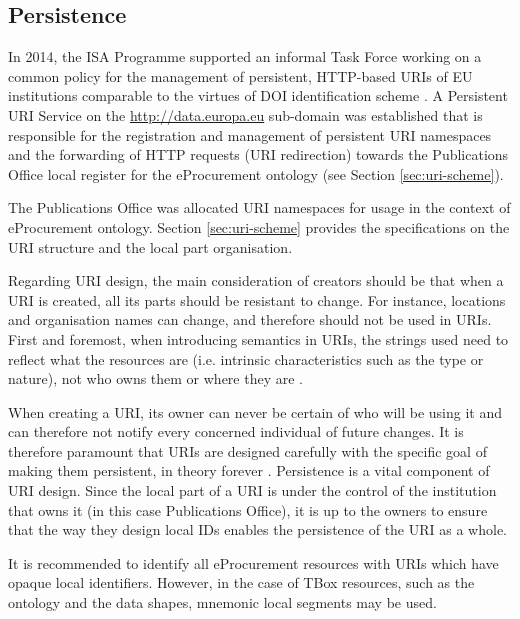 	\subsection{Persistence}
	\label{sec:persistence}
	
	In 2014, the ISA Programme supported an informal Task Force working on a common policy for the management of persistent, HTTP-based URIs of EU institutions comparable to the virtues of DOI identification scheme  \citep{d4.02.3-2018}. A Persistent URI Service on the \url{http://data.europa.eu} sub-domain was established that is responsible for the registration and management of persistent URI namespaces and the forwarding of HTTP requests (URI redirection) towards the Publications Office local register for the eProcurement ontology (see Section \ref{sec:uri-scheme}). 

	
	The Publications Office was allocated  URI namespaces for usage in the context of eProcurement ontology. Section \ref{sec:uri-scheme} provides the specifications on the URI structure and the local part organisation. 
		
	Regarding URI design, the main consideration of creators should be that when a URI is created, all its parts should be resistant to change. For instance, locations and organisation names can change, and therefore should not be used in URIs. First and foremost, when introducing semantics in URIs, the strings used need to reflect what	the resources are (i.e. intrinsic characteristics such as the type or nature), not who owns them or where they are \cite{d4.02.02-2018}. 

	When creating a URI, its owner can never be certain of who will be using it and can	therefore not notify every concerned individual of future changes. It is therefore	paramount that URIs are designed carefully with the specific goal of making them persistent, in theory forever \cite{burners1998cool}. Persistence is a vital component of URI design.	Since the local part of a URI is under the control of the institution that owns it (in this case Publications Office), it is up to the owners to ensure that the way they design local IDs enables the persistence of the URI as a whole.
	
	It is recommended to identify all eProcurement resources with URIs which have opaque local identifiers. However, in the case of TBox resources, such as the ontology and the data shapes, mnemonic local segments may be used.
		
